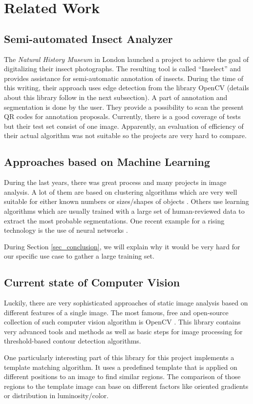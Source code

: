 %
\section{Related Work}
\label{sec_related}

\subsection{Semi-automated Insect Analyzer}

The \emph{Natural History Museum} in London launched a project to achieve the goal of digitalizing their insect photographs. 
The resulting tool is called ``Inselect'' \cite{Inselect} and provides assistance for semi-automatic annotation of insects. 
During the time of this writing, their approach uses edge detection from the library OpenCV (details about this library follow in the next subsection).
A part of annotation and segmentation is done by the user. 
They provide a possibility to scan the present QR codes for annotation proposals.
Currently, there is a good coverage of tests but their test set consist of one image.
Apparently, an evaluation of efficiency of their actual algorithm was not suitable so the projects are very hard to compare.

\subsection{Approaches based on Machine Learning}

During the last years, there was great process and many projects in image analysis. 
A lot of them are based on clustering algorithms which are very well suitable for either known numbers or sizes/shapes of objects \cite{Pappas}. 
Others use learning algorithms which are usually trained with a large set of human-reviewed data to extract the most probable segmentations.
One recent example for a rising technology is the use of neural networks \cite{turagal}.

During Section \ref{sec_conclusion}, we will explain why it would be very hard for our specific use case to gather a large training set.

\subsection{Current state of Computer Vision}

Luckily, there are very sophisticated approaches of static image analysis based on different features of a single image.
The most famous, free and open-source collection of such computer vision algorithm is OpenCV \cite{opencv_library}. 
This library contains very advanced tools and methods as well as basic steps for image processing for threshold-based contour detection algorithms.

One particularly interesting part of this library for this project implements a template matching algorithm. 
It uses a predefined template that is applied on different positions to an image to find similar regions.
The comparison of those regions to the template image can base on different factors like oriented gradients or distribution in luminosity/color.
